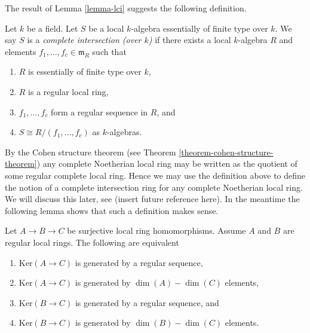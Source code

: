 \noindent
The result of Lemma \ref{lemma-lci} suggests the following definition.

\begin{definition}
\label{definition-lci-local-ring}
Let $k$ be a field. Let $S$ be a local $k$-algebra essentially of finite type
over $k$. We say $S$ is a {\it complete intersection (over $k$)}
if there exists a local $k$-algebra $R$ and elements
$f_1, \ldots, f_c \in \mathfrak m_R$ such that
\begin{enumerate}
\item $R$ is essentially of finite type over $k$,
\item $R$ is a regular local ring,
\item $f_1, \ldots, f_c$ form a regular sequence in $R$, and
\item $S \cong R/(f_1, \ldots, f_c)$ as $k$-algebras.
\end{enumerate}
\end{definition}

\noindent
By the Cohen structure theorem (see
Theorem \ref{theorem-cohen-structure-theorem}) any complete
Noetherian local ring may be written as the quotient of some regular complete
local ring. Hence we may use the definition above to define the notion of
a complete intersection ring for any complete Noetherian local ring.
We will discuss this later, see (insert future reference here). In the meantime
the following lemma shows that such a definition makes sense.

\begin{lemma}
\label{lemma-ci-well-defined}
Let $A \to B \to C$ be surjective local ring homomorphisms.
Assume $A$ and $B$ are regular local rings. The following are equivalent
\begin{enumerate}
\item $\text{Ker}(A \to C)$ is generated by a regular sequence,
\item $\text{Ker}(A \to C)$ is generated by $\dim(A) - \dim(C)$ elements,
\item $\text{Ker}(B \to C)$ is generated by a regular sequence, and
\item $\text{Ker}(B \to C)$ is generated by $\dim(B) - \dim(C)$ elements.
\end{enumerate}
\end{lemma}

